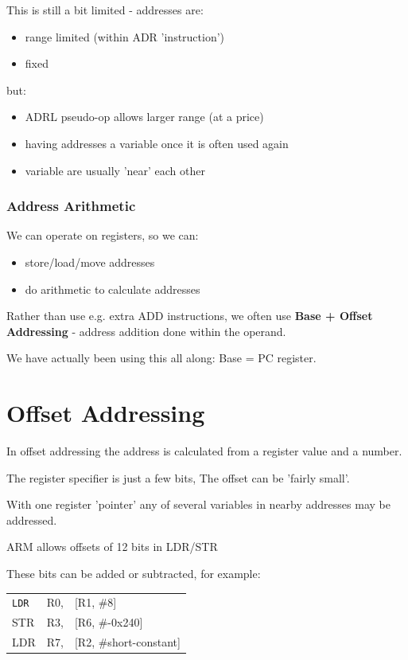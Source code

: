 \documentclass{article}
\begin{document}
This is still a bit limited - addresses are:

\begin{itemize}
  \item range limited (within ADR 'instruction')
  \item fixed
\end{itemize}

but:

\begin{itemize}
  \item ADRL pseudo-op allows larger range (at a price)
  \item having addresses a variable once it is often used again
  \item variable are usually 'near' each other
\end{itemize}

\subsubsection{Address Arithmetic}
We can operate on registers, so we can:

\begin{itemize}
  \item store/load/move addresses
  \item do arithmetic to calculate addresses
\end{itemize}

Rather than use e.g. extra ADD instructions, we often use {\bf Base + Offset Addressing} - address addition done within the operand.

We have actually been using this all along: Base = PC register.

\section{Offset Addressing}
In offset addressing the address is calculated from a register value and a number.

The register specifier is just a few bits, The offset can be 'fairly small'.

With one register 'pointer' any of several variables in nearby addresses may be addressed.

ARM allows offsets of 12 bits in LDR/STR

These bits can be added or subtracted, for example:

\begin{center}
    \begin{tabular}{l l l}
        {\tt LDR} & R0, & [R1, \#8] \\
        STR & R3, & [R6, \#-0x240]\\
        LDR & R7, & [R2, \#short-constant]
    \end{tabular}
\end{center}
\end{document}
